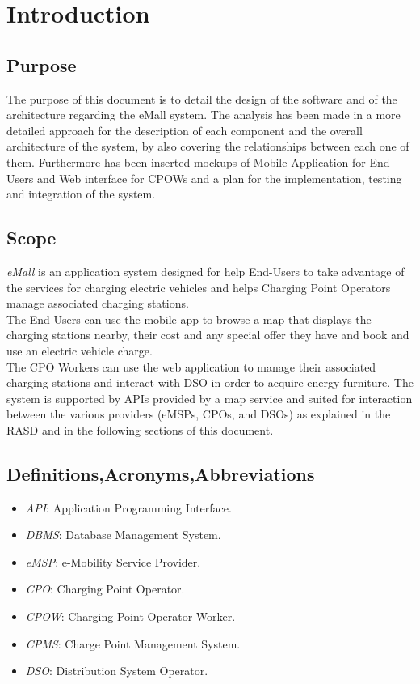 \documentclass[a4paper]{report}
\begin{document}
\tableofcontents
\listoffigures
\begingroup
\let\clearpage\relax %
\listoftables
\endgroup
\restoregeometry

\chapter{Introduction}
\section{Purpose}

The purpose of this document is to detail the design of the software and of the architecture regarding the eMall system. The analysis has been made in a more detailed approach for the description of each component
and the overall architecture of the system, by also covering the relationships between each one of them. Furthermore has been inserted mockups of Mobile Application for End-Users and Web interface for CPOWs and a plan for the implementation,
testing and integration of the system.

\section{Scope}
\textit{eMall} is an application system designed for help End-Users to take advantage of the services for charging electric vehicles and helps Charging Point Operators manage associated charging
stations.\\
The End-Users can use the mobile app to browse a map that displays the charging stations nearby, their cost and any special offer they have and book and use an electric vehicle charge.\\
The CPO Workers can use the web application to manage their associated charging stations and interact with DSO in order to acquire energy furniture. The system is supported by APIs provided by a map service and suited for interaction between the various providers (eMSPs, CPOs, and DSOs) as explained in the RASD and in the following sections of this document.
\section{Definitions,Acronyms,Abbreviations}
\begin{itemize}
\item \textit{API}: Application Programming Interface.
\item \textit{DBMS}: Database Management System.
\item \textit{eMSP}: e-Mobility Service Provider.
\item \textit{CPO}: Charging Point Operator.
\item \textit{CPOW}: Charging Point Operator Worker.
\item \textit{CPMS}: Charge Point Management System.
\item \textit{DSO}: Distribution System Operator.
\end{itemize}
\end{document}
